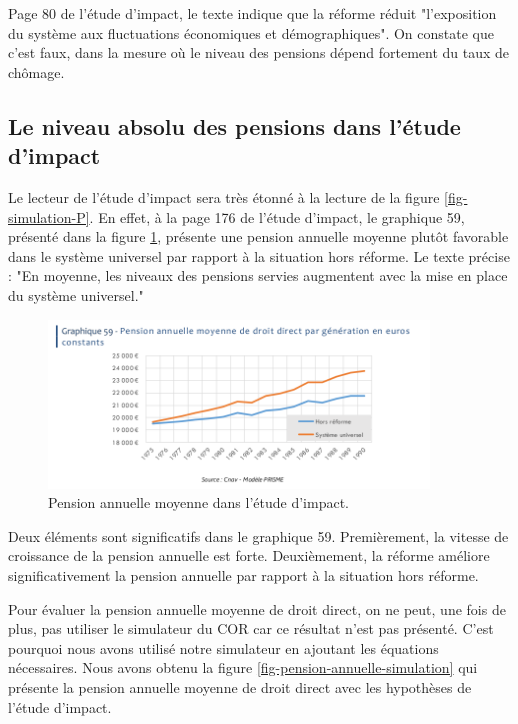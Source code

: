 \documentclass[10pt]{article}
\begin{document}
Page 80 de l'étude d'impact, le texte indique que la réforme 
réduit "l’exposition du système aux fluctuations économiques et démographiques". 
On constate que c'est faux, dans la mesure où le niveau des pensions 
dépend fortement du taux de chômage.


\subsection{Le niveau absolu des pensions dans l'étude d'impact}

Le lecteur de l'étude d'impact sera très étonné à la lecture de la figure 
\ref{fig-simulation-P}. 
En effet, à la page 176 de l'étude d'impact, le graphique 59, 
présenté dans la figure \ref{fig-pension-annuelle-etude-impact}, 
présente une pension annuelle moyenne plutôt favorable dans le système 
universel par rapport à la situation hors réforme. 
Le texte précise : "En moyenne, les niveaux des pensions servies augmentent 
avec la mise en place du système universel."

\begin{figure}
\begin{center}
\includegraphics[width=0.9\textwidth]{../Figures-Etude-Impact/EtudeImpact-Graphique-59-PensionAnnuelle.png}
\end{center}

\caption{Pension annuelle moyenne dans l'étude d'impact.}
\label{fig-pension-annuelle-etude-impact}
\end{figure}

Deux éléments sont significatifs dans le graphique 59. 
Premièrement, la vitesse de croissance de la pension annuelle est forte. 
Deuxièmement, la réforme améliore significativement la pension annuelle 
par rapport à la situation hors réforme. 

Pour évaluer la pension annuelle moyenne de droit direct, on ne peut, 
une fois de plus, pas utiliser le simulateur du COR car ce résultat 
n'est pas présenté. 
C'est pourquoi nous avons utilisé notre simulateur en ajoutant les équations 
nécessaires. 
Nous avons obtenu la figure \ref{fig-pension-annuelle-simulation} qui présente 
la pension annuelle moyenne de droit direct avec les hypothèses de l'étude d'impact. 
\end{document}

